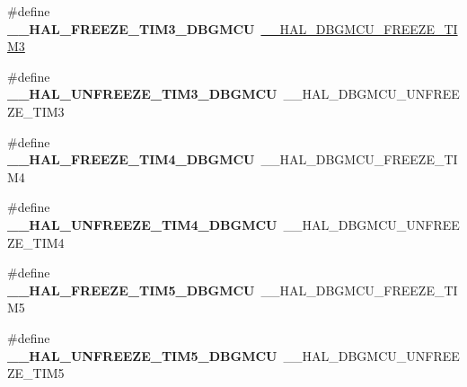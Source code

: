 \begin{DoxyCompactItemize}
\mbox{\label{group___h_a_l___d_b_g_m_c_u___aliased___macros_gab77737aff6c6ee212a5837dd7320c06b}} 
\#define {\bfseries \+\_\+\+\_\+\+H\+A\+L\+\_\+\+F\+R\+E\+E\+Z\+E\+\_\+\+T\+I\+M3\+\_\+\+D\+B\+G\+M\+CU}~\hyperlink{group___d_b_g_m_c_u___freeze___unfreeze_gaf2fe2b6d0a5e8df4ebb38020acf210d9}{\+\_\+\+\_\+\+H\+A\+L\+\_\+\+D\+B\+G\+M\+C\+U\+\_\+\+F\+R\+E\+E\+Z\+E\+\_\+\+T\+I\+M3}
\item 
\mbox{\label{group___h_a_l___d_b_g_m_c_u___aliased___macros_ga3f10f260e5d0f57927abfaa221852adc}} 
\#define {\bfseries \+\_\+\+\_\+\+H\+A\+L\+\_\+\+U\+N\+F\+R\+E\+E\+Z\+E\+\_\+\+T\+I\+M3\+\_\+\+D\+B\+G\+M\+CU}~\+\_\+\+\_\+\+H\+A\+L\+\_\+\+D\+B\+G\+M\+C\+U\+\_\+\+U\+N\+F\+R\+E\+E\+Z\+E\+\_\+\+T\+I\+M3
\item 
\mbox{\label{group___h_a_l___d_b_g_m_c_u___aliased___macros_ga09debeabdcdea1cb332a0de450baba57}} 
\#define {\bfseries \+\_\+\+\_\+\+H\+A\+L\+\_\+\+F\+R\+E\+E\+Z\+E\+\_\+\+T\+I\+M4\+\_\+\+D\+B\+G\+M\+CU}~\+\_\+\+\_\+\+H\+A\+L\+\_\+\+D\+B\+G\+M\+C\+U\+\_\+\+F\+R\+E\+E\+Z\+E\+\_\+\+T\+I\+M4
\item 
\mbox{\label{group___h_a_l___d_b_g_m_c_u___aliased___macros_gac8c490bc65df67f5ffd791f98bff8684}} 
\#define {\bfseries \+\_\+\+\_\+\+H\+A\+L\+\_\+\+U\+N\+F\+R\+E\+E\+Z\+E\+\_\+\+T\+I\+M4\+\_\+\+D\+B\+G\+M\+CU}~\+\_\+\+\_\+\+H\+A\+L\+\_\+\+D\+B\+G\+M\+C\+U\+\_\+\+U\+N\+F\+R\+E\+E\+Z\+E\+\_\+\+T\+I\+M4
\item 
\mbox{\label{group___h_a_l___d_b_g_m_c_u___aliased___macros_ga3fc7dba3ede61d40d034a57ffd69eab5}} 
\#define {\bfseries \+\_\+\+\_\+\+H\+A\+L\+\_\+\+F\+R\+E\+E\+Z\+E\+\_\+\+T\+I\+M5\+\_\+\+D\+B\+G\+M\+CU}~\+\_\+\+\_\+\+H\+A\+L\+\_\+\+D\+B\+G\+M\+C\+U\+\_\+\+F\+R\+E\+E\+Z\+E\+\_\+\+T\+I\+M5
\item 
\mbox{\label{group___h_a_l___d_b_g_m_c_u___aliased___macros_gaaf52c2c670e73f52ef844a7f81c1a80d}} 
\#define {\bfseries \+\_\+\+\_\+\+H\+A\+L\+\_\+\+U\+N\+F\+R\+E\+E\+Z\+E\+\_\+\+T\+I\+M5\+\_\+\+D\+B\+G\+M\+CU}~\+\_\+\+\_\+\+H\+A\+L\+\_\+\+D\+B\+G\+M\+C\+U\+\_\+\+U\+N\+F\+R\+E\+E\+Z\+E\+\_\+\+T\+I\+M5

\end{DoxyCompactItemize}
